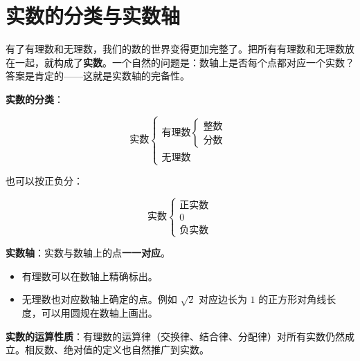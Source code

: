 \section*{实数的分类与实数轴}


\begin{explore}


有了有理数和无理数，我们的数的世界变得更加完整了。把所有有理数和无理数放在一起，就构成了\textbf{实数}。一个自然的问题是：数轴上是否每个点都对应一个实数？答案是肯定的——这就是实数轴的完备性。

\end{explore}

\begin{understand}


\textbf{实数的分类}：

\[
\text{实数}\begin{cases}
\text{有理数}\begin{cases} \text{整数} \\ \text{分数} \end{cases} \\[6pt]
\text{无理数}
\end{cases}
\]


也可以按正负分：

\[
\text{实数}\begin{cases}
\text{正实数} \\
0 \\
\text{负实数}
\end{cases}
\]


\textbf{实数轴}：实数与数轴上的点\textbf{一一对应}。

\begin{itemize}
  \item 有理数可以在数轴上精确标出。
  \item 无理数也对应数轴上确定的点。例如 $\sqrt{2}$ 对应边长为 $1$ 的正方形对角线长度，可以用圆规在数轴上画出。
\end{itemize}


\textbf{实数的运算性质}：有理数的运算律（交换律、结合律、分配律）对所有实数仍然成立。相反数、绝对值的定义也自然推广到实数。

\end{understand}

